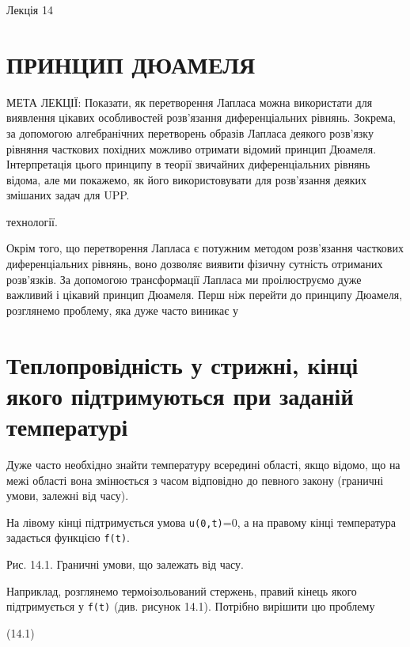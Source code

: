 \documentclass[
  ukrainian,
]{article}
\begin{document}
Лекція 14

\section{ПРИНЦИП
ДЮАМЕЛЯ}\label{ux43fux440ux438ux43dux446ux438ux43f-ux434ux44eux430ux43cux435ux43bux44f}

МЕТА ЛЕКЦІЇ: Показати, як перетворення Лапласа можна використати для
виявлення цікавих особливостей розв'язання диференціальних рівнянь.
Зокрема, за допомогою алгебранічних перетворень образів Лапласа деякого
розв'язку рівняння часткових похідних можливо отримати відомий принцип
Дюамеля. Інтерпретація цього принципу в теорії звичайних диференціальних
рівнянь відома, але ми покажемо, як його використовувати для розв'язання
деяких змішаних задач для UPP.

технології.

Окрім того, що перетворення Лапласа є потужним методом розв'язання
часткових диференціальних рівнянь, воно дозволяє виявити фізичну
сутність отриманих розв'язків. За допомогою трансформації Лапласа ми
проілюструємо дуже важливий і цікавий принцип Дюамеля. Перш ніж перейти
до принципу Дюамеля, розглянемо проблему, яка дуже часто виникає у

\section{Теплопровідність у стрижні, кінці якого підтримуються при
заданій
температурі}\label{ux442ux435ux43fux43bux43eux43fux440ux43eux432ux456ux434ux43dux456ux441ux442ux44c-ux443-ux441ux442ux440ux438ux436ux43dux456-ux43aux456ux43dux446ux456-ux44fux43aux43eux433ux43e-ux43fux456ux434ux442ux440ux438ux43cux443ux44eux442ux44cux441ux44f-ux43fux440ux438-ux437ux430ux434ux430ux43dux456ux439-ux442ux435ux43cux43fux435ux440ux430ux442ux443ux440ux456}

Дуже часто необхідно знайти температуру всередині області, якщо відомо,
що на межі області вона змінюється з часом відповідно до певного закону
(граничні умови, залежні від часу).

На лівому кінці підтримується умова \texttt{u(0,t)}=0, а на правому
кінці температура задається функцією \texttt{f(t)}.

Рис. 14.1. Граничні умови, що залежать від часу.

Наприклад, розглянемо термоізольований стержень, правий кінець якого
підтримується у \texttt{f(t)} (див. рисунок 14.1). Потрібно вирішити цю
проблему

(14.1)
\end{document}
